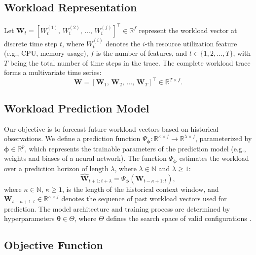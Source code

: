\documentclass{ieeetmlcn}
\begin{document}
\subsection{Workload Representation}

Let $\mathbf{W}_t = [W_t^{(1)},\, W_t^{(2)},\, \ldots,\, W_t^{(f)}]^\top \in \mathbb{R}^f$ represent the workload vector \cite{zhou2021informer} at discrete time step $t$, where $W_t^{(i)}$ denotes the $i$-th resource utilization feature (e.g., CPU, memory usage), $f$ is the number of features, and $t \in \{1, 2, \ldots, T\}$, with $T$ being the total number of time steps in the trace. The complete workload trace forms a multivariate time series:
\begin{equation}
\mathbf{W} = [\mathbf{W}_1,\, \mathbf{W}_2,\, \ldots,\, \mathbf{W}_T]^\top \in \mathbb{R}^{T \times f}.
\end{equation}

\subsection{Workload Prediction Model}

Our objective is to forecast future workload vectors based on historical observations. We define a prediction function $\Psi_{\boldsymbol{\phi}}: \mathbb{R}^{\kappa \times f} \rightarrow \mathbb{R}^{\lambda \times f}$, parameterized by $\boldsymbol{\phi} \in \mathbb{R}^p$, which represents the trainable parameters of the prediction model (e.g., weights and biases of a neural network). The function $\Psi_{\boldsymbol{\phi}}$ estimates the workload over a prediction horizon of length $\lambda$, where $\lambda \in \mathbb{N}$ and $\lambda \geq 1$:
\begin{equation}
\label{eq:forecast_workload}
\hat{\mathbf{W}}_{t+1:t+\lambda} = \Psi_{\boldsymbol{\phi}}\left( \mathbf{W}_{t-\kappa+1:t} \right),
\end{equation}
where $\kappa \in \mathbb{N}$, $\kappa \geq 1$, is the length of the historical context window, and $\mathbf{W}_{t-\kappa+1:t} \in \mathbb{R}^{\kappa \times f}$ denotes the sequence of past workload vectors used for prediction. The model architecture and training process are determined by hyperparameters $\boldsymbol{\theta} \in \Theta$, where $\Theta$ defines the search space of valid configurations \cite{hyperparamsdatasets}.

\subsection{Objective Function}
\end{document}
